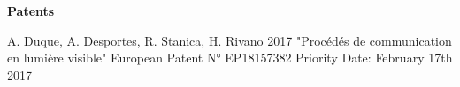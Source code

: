 \documentclass[]{cv-style}          %
\begin{document}

\large{\textbf{Patents}}

\normalsize
\begin{publist}
\pat
{A. Duque, A. Desportes,  R. Stanica, H. Rivano}
{2017}
{"Procédés de communication en lumière visible"}
{European Patent N° EP18157382}
{Priority Date: February 17th 2017}
\\
\end{publist}






\end{document}
